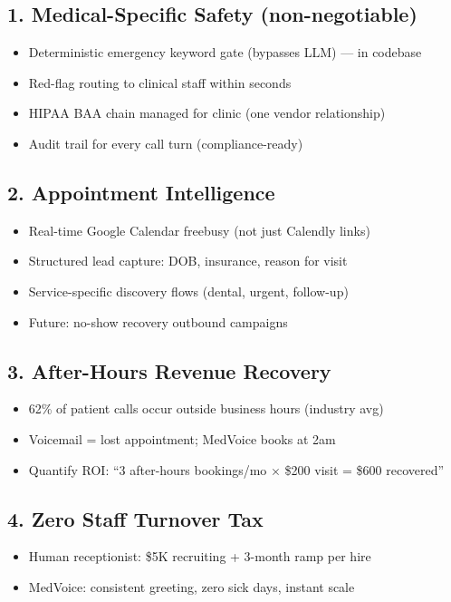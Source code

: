\documentclass[11pt,a4paper]{article}
\begin{document}
\subsection{1. Medical-Specific Safety (non-negotiable)}
\begin{itemize}[nosep]
  \item Deterministic emergency keyword gate (bypasses LLM) --- \verified in codebase
  \item Red-flag routing to clinical staff within seconds
  \item HIPAA BAA chain managed for clinic (one vendor relationship)
  \item Audit trail for every call turn (compliance-ready)
\end{itemize}

\subsection{2. Appointment Intelligence}
\begin{itemize}[nosep]
  \item Real-time Google Calendar freebusy (not just Calendly links)
  \item Structured lead capture: DOB, insurance, reason for visit
  \item Service-specific discovery flows (dental, urgent, follow-up)
  \item Future: no-show recovery outbound campaigns
\end{itemize}

\subsection{3. After-Hours Revenue Recovery}
\begin{itemize}[nosep]
  \item 62\% of patient calls occur outside business hours (industry avg)
  \item Voicemail = lost appointment; MedVoice books at 2am
  \item Quantify ROI: ``3 after-hours bookings/mo $\times$ \$200 visit = \$600 recovered''
\end{itemize}

\subsection{4. Zero Staff Turnover Tax}
\begin{itemize}[nosep]
  \item Human receptionist: \$5K recruiting + 3-month ramp per hire
  \item MedVoice: consistent greeting, zero sick days, instant scale
\end{itemize}
\end{document}
